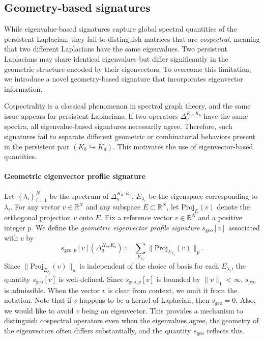 \documentclass{article}
\newcommand{\R}{\mathbb{R}}
\begin{document}
\subsection{Geometry-based signatures}\label{sec:l1l2}
While eigenvalue-based signatures capture global spectral quantities of the persistent Laplacian, they fail to distinguish matrices that are \emph{cospectral}, meaning that two different Laplacians have the same eigenvalues. Two persistent Laplacians may share identical eigenvalues but differ significantly in the 
geometric structure encoded by their eigenvectors. To overcome this limitation, we introduce a novel geometry-based signature that incorporates eigenvector information.

Cospectrality is a classical phenomenon in spectral graph theory, and the same issue appears for persistent Laplacians. If two operators $\Delta^{K_d,K_b}_q$ have the same spectra, all eigenvalue-based signatures necessarily agree. Therefore, such signatures fail to separate different geometric or combinatorial behaviors present in the persistent pair $(K_b \hookrightarrow K_d)$. This motivates the use of eigenvector-based quantities.

\paragraph*{Geometric eigenvector profile signature}

Let $\left\{ \lambda_i \right\}_{i=1}^N$ be the spectrum of $\Delta^{K_d,K_b}_q$, $E_{\lambda_i}$ be the eigenspace corresponding to $\lambda_i$. For any vector $v\in\R^N$ and any subspace $E \subset \R^N$, let $\textrm{Proj}_{E}(v)$ denote the orthogonal projection $v$ onto $E$. Fix a reference vector $v \in \R^{N}$ and a positive integer $p$. We define the \emph{geometric eigenvector profile signature} $s_{\mathrm{geo}}[v]$ associated with $v$ by
\[
s_{\mathrm{geo},p}[v](\Delta^{K_d,K_b}_q) := \sum_{E_{\lambda_i}} \|\textrm{Proj}_{E_{\lambda_i}}(v)\|_p.
\]
Since $\|\mathrm{Proj}_{E_{\lambda_i}}(v)\|_p$ is independent of the choice of basis for each $E_{\lambda_i}$, the quantity $s_{\mathrm{geo}}[v]$ is well-defined. Since $s_{\mathrm{geo},p}[v]$ is bounded by $\|v\|_1 < \infty$, $s_{geo}$ is admissible. When the vector $v$ is clear from context, we omit it from the notation. Note that if $v$ happens to be a kernel of Laplacian, then $s_{\mathrm{geo}}=0$. Also, we would like to avoid $v$ being an eigenvector. This provides a mechanism to distinguish cospectral operators even when the eigenvalues agree, the geometry of the eigenvectors often differs substantially, and the quantity $s_{\mathrm{geo}}$ reflects this.
\end{document}
